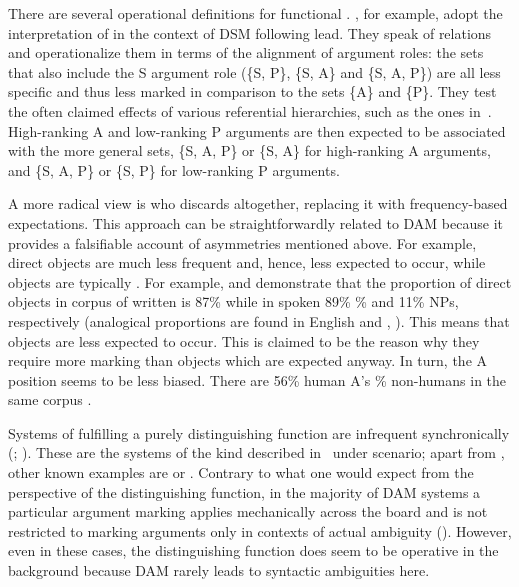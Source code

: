 \documentclass[output=paper]{LSP/langsci}
\begin{document}
There are several operational definitions for functional . 
\citet[10]{Bickeletal2015Typological}, for example, 
adopt the interpretation of  in the context of DSM following  lead. 
They speak of  relations and operationalize them in terms of the alignment of argument roles: the sets that also include the S argument role (\ie \{S, P\}, \{S, A\} and \{S, A, P\}) are all less specific and thus less marked in comparison to the sets \{A\} and \{P\}. 
They test the often claimed effects of various referential hierarchies, such as the ones in~. High-ranking A and low-ranking P arguments are then expected to be associated with the more general sets, \ie \{S, A, P\} or \{S, A\} for high-ranking A arguments, and \{S, A, P\} or \{S, P\} for low-ranking P arguments.

A more radical view is \citet{Haspelmath2006Against} who discards  altogether, replacing it with frequency-based expectations. 
This approach can be straightforwardly related to DAM because it provides a falsifiable account of asymmetries mentioned above. 
For example,  direct objects are much less frequent and, hence, less expected to occur, while objects are typically . 
For example, \citet[51]{Dahetal1996Animacy} and \citet{Dahl2000Egophoricity} demonstrate that the proportion of  \vs {} direct objects in corpus of written  is 87\%  while in spoken  89\%  \% and 11\%  NPs, respectively (analogical proportions are found in English and , \cf \citealt[6, 12]{Everett2009Reconsideration}). 
This means that  objects are less expected to occur. 
This is claimed to be the reason why they require more marking than  objects which are expected anyway. In turn, the A position seems to be less biased. 
There are 56\% human A’s \% non-humans in the same corpus \citep[51]{Dahetal1996Animacy}.

Systems of  fulfilling a purely distinguishing function are infrequent synchronically (\citealt{deHoopetal2005Differential}; \citealt[569]{Hoopetal2008Case-marking}). 
These are the systems of the kind described in~ under scenario; apart from , other known examples are  \citep{Feldman1986Grammar} or  \citep{Haimann1979Hua}. 
Contrary to what one would expect from the perspective of the distinguishing function, in the majority of DAM systems a particular argument marking applies mechanically across the board and is not restricted to marking arguments only in contexts of actual ambiguity (\cf \citealt[213]{Malchukov2008Animacy}). 
However, even in these cases, the distinguishing function does seem to be operative in the background because DAM rarely leads to syntactic ambiguities here. 
\end{document}
